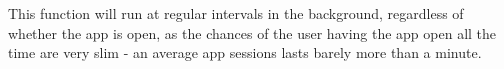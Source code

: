 \documentclass[11pt]{informatics-report}
\begin{document}
This function will run at regular intervals in the background, regardless of whether the app is open, as the chances of the user having the app open all the time are very slim - an average app sessions lasts barely more than a minute\cite{Bohmer:2011:FAA:2037373.2037383}. 

%
%
%
%
%
%






\appendix

%
%
\end{document}
